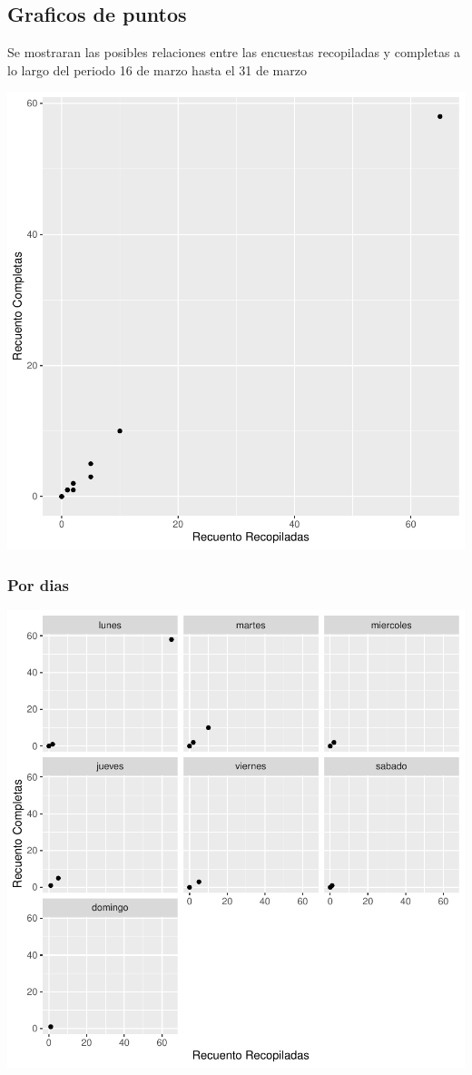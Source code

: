 \documentclass{article}
\begin{document}
\subsection{Graficos de puntos}
Se mostraran las posibles relaciones entre las encuestas recopiladas y completas a lo largo del periodo 16 de marzo hasta el 31 de marzo

\includegraphics{seguimento2-064}

\subsubsection{Por dias}

\includegraphics{seguimento2-065}
\end{document}
